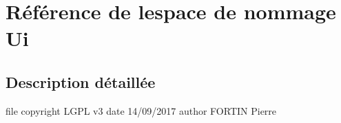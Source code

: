 \hypertarget{namespace_ui}{}\section{Référence de l\textquotesingle{}espace de nommage Ui}
\label{namespace_ui}


\subsection{Description détaillée}
file copyright L\+G\+PL v3 date 14/09/2017 author F\+O\+R\+T\+IN Pierre 